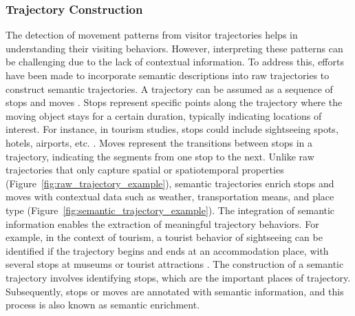 \documentclass{article}
\theoremstyle{remark}
\begin{document}
 
\subsubsection{Trajectory Construction}
The detection of movement patterns from visitor trajectories helps in understanding their visiting behaviors. However, interpreting these patterns can be challenging due to the lack of contextual information. To address this, efforts have been made to incorporate semantic descriptions into raw trajectories to construct semantic trajectories. A trajectory can be assumed as a sequence of stops and moves \citep{spaccapietra_conceptual_2008}. Stops represent specific points along the trajectory where the moving object stays for a certain duration, typically indicating locations of interest. For instance, in tourism studies, stops could include sightseeing spots, hotels, airports, etc. \citep{yuan_review_2017}. Moves represent the transitions between stops in a trajectory, indicating the segments from one stop to the next. Unlike raw trajectories that only capture spatial or spatiotemporal properties (Figure~\ref{fig:raw_trajectory_example}), semantic trajectories enrich stops and moves with contextual data such as weather, transportation means, and place type (Figure~\ref{fig:semantic_trajectory_example}). The integration of semantic information enables the extraction of meaningful trajectory behaviors. For example, in the context of tourism, a tourist behavior of sightseeing can be identified if the trajectory begins and ends at an accommodation place, with several stops at museums or tourist attractions \citep{parent_semantic_2013}. The construction of a semantic trajectory involves identifying stops, which are the important places of trajectory. Subsequently, stops or moves are annotated with semantic information, and this process is also known as semantic enrichment.
\end{document}
